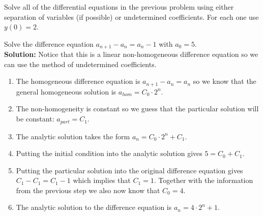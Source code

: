 \begin{problem}
    Solve all of the differential equations in the previous problem using either
    separation of variables (if possible) or undetermined coefficients. For each one use
    $y(0) = 2$.
\end{problem}

% 


\begin{example}
    Solve the difference equation $a_{n+1} - a_n = a_n - 1$ with $a_0 = 5$.  \\{\bf
    Solution:} Notice that this is a linear non-homogeneous difference equation so we can
    use the method of undetermined coefficients.
    \begin{enumerate}
        \item The homogeneous difference equation is $a_{n+1} - a_n = a_n$ so we know that
            the general homogeneous solution is $a_{hom} = C_0\cdot 2^n$.
        \item The non-homogeneity is constant so we guess that the particular solution
            will be constant: $a_{part} = C_1$.
        \item The analytic solution takes the form $a_n = C_0 \cdot 2^n + C_1$.  
        \item Putting the initial condition into the analytic solution gives $5= C_0 +
            C_1$.
        \item Putting the particular solution into the original difference equation gives
            $C_1 - C_1 = C_1 - 1$ which implies that $C_1 = 1$.  Together with the
            information from the previous step we also now know that $C_0 = 4$.
        \item The analytic solution to the difference equation is $a_n = 4 \cdot 2^n + 1$.
    \end{enumerate}
\end{example}


